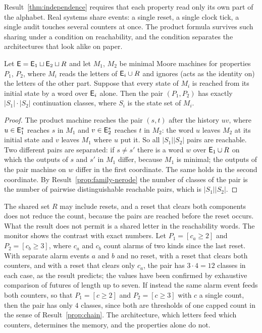 Result~\ref{thm:independence} requires that each property read only its own part of the alphabet. Real systems share events: a single reset, a single clock tick, a single audit touches several counters at once. The product formula survives such sharing under a condition on reachability, and the condition separates the architectures that look alike on paper.

\begin{newresult}\label{prop:shared-events}
Let $\mathsf{E}=\mathsf{E}_1\sqcup\mathsf{E}_2\sqcup R$ and let $M_1$, $M_2$ be minimal Moore machines for properties $P_1$, $P_2$, where $M_i$ reads the letters of $\mathsf{E}_i\cup R$ and ignores (acts as the identity on) the letters of the other part. Suppose that every state of $M_i$ is reached from its initial state by a word over $\mathsf{E}_i$ alone. Then the pair $(P_1,P_2)$ has exactly $|S_1|\cdot|S_2|$ continuation classes, where $S_i$ is the state set of $M_i$.
\end{newresult}
\begin{proof}
The product machine reaches the pair $(s,t)$ after the history $uv$, where $u\in\mathsf{E}_1^{*}$ reaches $s$ in $M_1$ and $v\in\mathsf{E}_2^{*}$ reaches $t$ in $M_2$: the word $u$ leaves $M_2$ at its initial state and $v$ leaves $M_1$ where $u$ put it. So all $|S_1||S_2|$ pairs are reachable. Two different pairs are separated: if $s\ne s'$ there is a word $w$ over $\mathsf{E}_1\cup R$ on which the outputs of $s$ and $s'$ in $M_1$ differ, because $M_1$ is minimal; the outputs of the pair machine on $w$ differ in the first coordinate. The same holds in the second coordinate. By Result~\ref{prop:family-nerode} the number of classes of the pair is the number of pairwise distinguishable reachable pairs, which is $|S_1||S_2|$.
\end{proof}

The shared set $R$ may include resets, and a reset that clears both components does not reduce the count, because the pairs are reached before the reset occurs. What the result does not permit is a shared letter in the reachability words. The monitor shows the contrast with exact numbers. Let $P_1=[c_a\ge2]$ and $P_2=[c_b\ge3]$, where $c_a$ and $c_b$ count alarms of two kinds since the last reset. With separate alarm events $a$ and $b$ and no reset, with a reset that clears both counters, and with a reset that clears only $c_a$, the pair has $3\cdot4=12$ classes in each case, as the result predicts; the values have been confirmed by exhaustive comparison of futures of length up to seven. If instead the same alarm event feeds both counters, so that $P_1=[c\ge2]$ and $P_2=[c\ge3]$ with $c$ a single count, then the pair has only $4$ classes, since both are thresholds of one capped count in the sense of Result~\ref{prop:chain}. The architecture, which letters feed which counters, determines the memory, and the properties alone do not.

